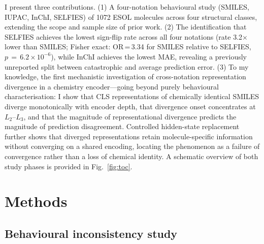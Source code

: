 \documentclass[twoside,twocolumn,9pt]{article}
\begin{document}
I present three contributions. (1) A four-notation behavioural study (SMILES, IUPAC, InChI, SELFIES) of 1072 ESOL molecules across four structural classes, extending the scope and sample size of prior work.\cite{yan2025,ganeeva2025} (2) The identification that SELFIES achieves the lowest sign-flip rate across all four notations (rate 3.2$\times$ lower than SMILES; Fisher exact: OR\,=\,3.34 for SMILES relative to SELFIES, $p\,=\,6.2\!\times\!10^{-6}$), while InChI achieves the lowest MAE, revealing a previously unreported split between catastrophic and average prediction error. (3) To my knowledge, the first mechanistic investigation of cross-notation representation divergence in a chemistry encoder---going beyond purely behavioural characterisation: I show that CLS representations of chemically identical SMILES diverge monotonically with encoder depth, that divergence onset concentrates at $L_2$--$L_3$, and that the magnitude of representational divergence predicts the magnitude of prediction disagreement. Controlled hidden-state replacement further shows that diverged representations retain molecule-specific information without converging on a shared encoding, locating the phenomenon as a failure of convergence rather than a loss of chemical identity. A schematic overview of both study phases is provided in Fig.~\ref{fig:toc}.

\section{Methods}

\subsection{Behavioural inconsistency study}
\end{document}
